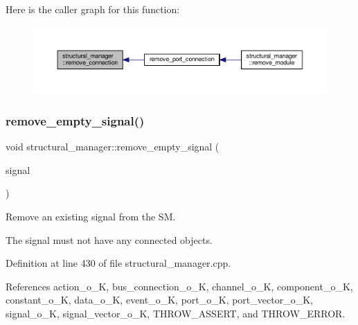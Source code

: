 Here is the caller graph for this function\+:
\nopagebreak
\begin{figure}[H]
\begin{center}
\leavevmode
\includegraphics[width=350pt]{d7/d6b/classstructural__manager_a5385fbdd2e9ce0f5a50e8d40ede945b2_icgraph}
\end{center}
\end{figure}
\mbox{\label{classstructural__manager_a0273b1f352c2db9e096946fe5d605ae4}} 
\subsubsection{\texorpdfstring{remove\+\_\+empty\+\_\+signal()}{remove\_empty\_signal()}}
{\footnotesize\ttfamily void structural\+\_\+manager\+::remove\+\_\+empty\+\_\+signal (\begin{DoxyParamCaption}\item[{\hyperlink{structural__objects_8hpp_a8ea5f8cc50ab8f4c31e2751074ff60b2}{structural\+\_\+object\+Ref} \&}]{signal }\end{DoxyParamCaption})}



Remove an existing signal from the SM. 

The signal must not have any connected objects. 

Definition at line 430 of file structural\+\_\+manager.\+cpp.



References action\+\_\+o\+\_\+K, bus\+\_\+connection\+\_\+o\+\_\+K, channel\+\_\+o\+\_\+K, component\+\_\+o\+\_\+K, constant\+\_\+o\+\_\+K, data\+\_\+o\+\_\+K, event\+\_\+o\+\_\+K, port\+\_\+o\+\_\+K, port\+\_\+vector\+\_\+o\+\_\+K, signal\+\_\+o\+\_\+K, signal\+\_\+vector\+\_\+o\+\_\+K, T\+H\+R\+O\+W\+\_\+\+A\+S\+S\+E\+RT, and T\+H\+R\+O\+W\+\_\+\+E\+R\+R\+OR.

\mbox{\label{classstructural__manager_a1160aa7f436e8238fe97864c86c834ad}} 
